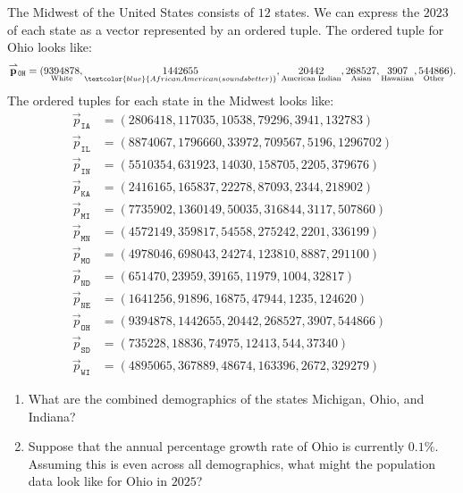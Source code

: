 \documentclass{ximera}
\begin{document}
\begin{example} %
  The Midwest of the United States consists of $12$ states. We can
  express the $2023$
  of each state as a vector represented by an ordered tuple. The
  ordered tuple for Ohio looks like:
  \[
  \vec{p}_{\texttt{OH}} = (\underset{\text{White}}{9394878},\underset{\textcolor{blue}{African American (sounds better)}}{1442655},\underset{\text{American Indian}}{20442},\underset{\text{Asian}}{268527},\underset{\text{Hawaiian}}{3907},\underset{\text{Other}}{544866}).
  \]
  The ordered tuples for each state in the Midwest looks like:
\begin{align*}
  \vec{p}_{\texttt{IA}} &= (2806418,117035,10538,79296,3941,132783)\\
  \vec{p}_{\texttt{IL}} &= (8874067,1796660,33972,709567,5196,1296702)\\
  \vec{p}_{\texttt{IN}} &= (5510354,631923,14030,158705,2205,379676)\\
  \vec{p}_{\texttt{KA}} &= (2416165,165837,22278,87093,2344,218902)\\
  \vec{p}_{\texttt{MI}} &= (7735902,1360149,50035,316844,3117,507860)\\
  \vec{p}_{\texttt{MN}} &= (4572149,359817,54558,275242,2201,336199)\\
  \vec{p}_{\texttt{MO}} &= (4978046,698043,24274,123810,8887,291100)\\
  \vec{p}_{\texttt{ND}} &= (651470,23959,39165,11979,1004,32817)\\
  \vec{p}_{\texttt{NE}} &= (1641256,91896,16875,47944,1235,124620)\\
  \vec{p}_{\texttt{OH}} &= (9394878,1442655,20442,268527,3907,544866)\\
  \vec{p}_{\texttt{SD}} &= (735228,18836,74975,12413,544,37340)\\
  \vec{p}_{\texttt{WI}} &= (4895065,367889,48674,163396,2672,329279)
\end{align*}
\begin{enumerate}
\item What are the combined demographics of the states Michigan, Ohio,
  and Indiana?
\item Suppose that the annual percentage growth rate of Ohio is
  currently $0.1\%$. Assuming this is even across all demographics,
  what might the population data look like for Ohio in $2025$?
\end{enumerate}

\end{example}
\end{document}
